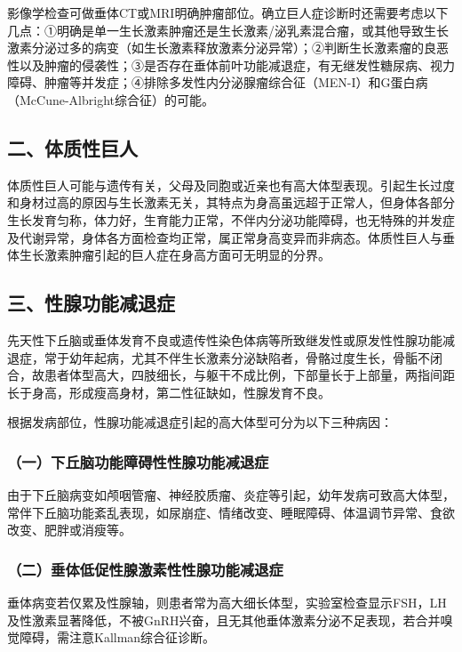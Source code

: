 影像学检查可做垂体CT或MRI明确肿瘤部位。确立巨人症诊断时还需要考虑以下几点：①明确是单一生长激素肿瘤还是生长激素/泌乳素混合瘤，或其他导致生长激素分泌过多的病变（如生长激素释放激素分泌异常）；②判断生长激素瘤的良恶性以及肿瘤的侵袭性；③是否存在垂体前叶功能减退症，有无继发性糖尿病、视力障碍、肿瘤等并发症；④排除多发性内分泌腺瘤综合征（MEN-I）和G蛋白病（McCune-Albright综合征）的可能。

\subsection{二、体质性巨人}

体质性巨人可能与遗传有关，父母及同胞或近亲也有高大体型表现。引起生长过度和身材过高的原因与生长激素无关，其特点为身高虽远超于正常人，但身体各部分生长发育匀称，体力好，生育能力正常，不伴内分泌功能障碍，也无特殊的并发症及代谢异常，身体各方面检查均正常，属正常身高变异而非病态。体质性巨人与垂体生长激素肿瘤引起的巨人症在身高方面可无明显的分界。

\subsection{三、性腺功能减退症}

先天性下丘脑或垂体发育不良或遗传性染色体病等所致继发性或原发性性腺功能减退症，常于幼年起病，尤其不伴生长激素分泌缺陷者，骨骼过度生长，骨骺不闭合，故患者体型高大，四肢细长，与躯干不成比例，下部量长于上部量，两指间距长于身高，形成瘦高身材，第二性征缺如，性腺发育不良。

根据发病部位，性腺功能减退症引起的高大体型可分为以下三种病因：

\subsubsection{（一）下丘脑功能障碍性性腺功能减退症}

由于下丘脑病变如颅咽管瘤、神经胶质瘤、炎症等引起，幼年发病可致高大体型，常伴下丘脑功能紊乱表现，如尿崩症、情绪改变、睡眠障碍、体温调节异常、食欲改变、肥胖或消瘦等。

\subsubsection{（二）垂体低促性腺激素性性腺功能减退症}

垂体病变若仅累及性腺轴，则患者常为高大细长体型，实验室检查显示FSH，LH及性激素显著降低，不被GnRH兴奋，且无其他垂体激素分泌不足表现，若合并嗅觉障碍，需注意Kallman综合征诊断。

